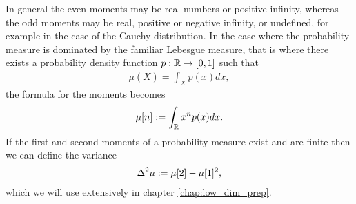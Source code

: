 In general the even moments may be real numbers or positive infinity, whereas the odd moments may be real, positive or negative infinity, or undefined, for example in the case of the Cauchy distribution. In the case where the probability measure is dominated by the familiar Lebesgue measure, that is where there exists a probability density function $p:\mathbb{R}\to[0,1]$ such that
\begin{align}
  \mu(X) = \int_X p(x) dx,
\end{align}
the formula for the moments becomes
\begin{align}
  \mu[n] := \int_{\mathbb{R}} x^n p(x) dx.
\end{align}
If the first and second moments of a probability measure exist and are finite then we can define the variance
\begin{align}
  \var{\mu} \defeq \mu[2] - \mu[1]^2, \label{eqn:prelim-def-variance}
\end{align}
which we will use extensively in chapter \ref{chap:low_dim_prep}.

